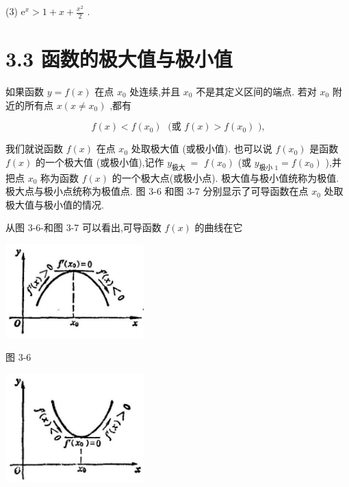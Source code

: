 \documentclass[10pt]{article}
\begin{document}
(3) \({\mathrm{e}}^{x} > 1 + x + \frac{{x}^{2}}{2}\) .

\section*{3.3 函数的极大值与极小值}

如果函数 \(y = f\left( x\right)\) 在点 \({x}_{0}\) 处连续,并且 \({x}_{0}\) 不是其定义区间的端点. 若对 \({x}_{0}\) 附近的所有点 \(x\left( {x \neq {x}_{0}}\right)\) ,都有

\[
f\left( x\right) < f\left( {x}_{0}\right) \;\text{ (或 }f\left( x\right) > f\left( {x}_{0}\right) \text{ ),}
\]

我们就说函数 \(f\left( x\right)\) 在点 \({x}_{0}\) 处取极大值 (或极小值). 也可以说 \(f\left( {x}_{0}\right)\) 是函数 \(f\left( x\right)\) 的一个极大值 (或极小值),记作 \({y}_{\text{极大 }} =\) \(f\left( {x}_{0}\right)\) (或 \({y}_{\text{极小 }1} = f\left( {x}_{0}\right)\) ),并把点 \({x}_{0}\) 称为函数 \(f\left( x\right)\) 的一个极大点(或极小点). 极大值与极小值统称为极值. 极大点与极小点统称为极值点. 图 3-6 和图 3-7 分别显示了可导函数在点 \({x}_{0}\) 处取极大值与极小值的情况.

从图 3-6-和图 3-7 可以看出,可导函数 \(f\left( x\right)\) 的曲线在它

\begin{center}
\includegraphics[max width=0.4\textwidth]{images/01912c18-5c3f-733d-b775-749ba9897a9d_141_386711.jpg}
\end{center}

图 3-6

\begin{center}
\includegraphics[max width=0.4\textwidth]{images/01912c18-5c3f-733d-b775-749ba9897a9d_141_950727.jpg}
\end{center}
\end{document}
